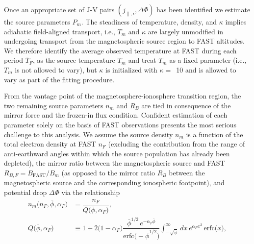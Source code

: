   Once an appropriate set of J-V pairs $( j_{\parallel,i} , \Delta \Phi )$ has
  been identified we estimate the source parameters $P_m$. The steadiness of
  temperature, density, and $\kappa$ implies adiabatic field-aligned transport,
  i.e., $T_m$ and $\kappa$ are largely unmodified in undergoing transport from
  the magnetospheric source region to FAST altitudes. We therefore identify the
  average observed temperature at FAST during each period $\bar{T}_F$, as the
  source temperature $T_m$ and treat $T_m$ as a fixed parameter (i.e., $T_m$ is
  not allowed to vary), but $\kappa$ is initialized with $\kappa =$~10 and is
  allowed to vary as part of the fitting procedure.

  From the vantage point of the magnetosphere-ionosphere transition region, the
  two remaining source parameters $n_m$ and $R_B$ are tied in consequence of
  the mirror force and the frozen-in flux condition. Confident estimation of
  each parameter solely on the basis of FAST observations presents the most
  serious challenge to this analysis. We assume the source density $n_m$ is a
  function of the total electron density at FAST $n_F$ (excluding the
  contribution from the range of anti-earthward angles within which the source
  population has already been depleted), the mirror ratio between the
  magnetospheric source and FAST $R_{B,F} = B_\textrm{FAST} / B_m$ (as opposed
  to the mirror ratio $R_B$ between the magnetospheric source and the
  corresponding ionospheric footpoint), and potential drop $\Delta \Phi$ via the
  relationship \citep{Barbosa1977}
  \begin{subequations}
    \begin{align} n_m \big ( n_F, \bar{\phi}, \alpha_F \big ) &= \dfrac{n_F}{Q \big ( \bar{\phi}, \alpha_F \big ) }, \label{ch6:eqnM} \\
      Q \big ( \bar{\phi}, \alpha_F \big ) &\equiv 1 + 2 \big ( 1 - \alpha_F
                                             \big ) \dfrac{ \bar{\phi}^{1/2} \,
                                             e^{- \alpha_F \bar{\phi}}
                                             }{\textrm{erfc} \big ( -
                                             \bar{\phi}^{1/2} \big )} {
                                             \displaystyle
                                             \int_{-\sqrt{\bar{\phi}}}^{\infty}
                                             } \, dx \, e^{\alpha_F x^2} \,
                                             \textrm{erfc} \big ( x \big
                                             ), \label{ch6:eqBarbosa}
    \end{align}
  \end{subequations}
